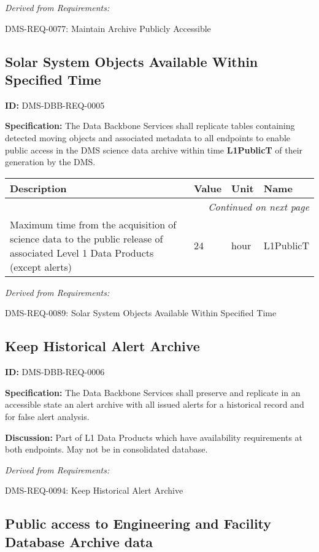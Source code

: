 \documentclass[SE,toc]{lsstdoc}
\makeatletter
\newcommand{\paramname}[1]{\hspace{0pt}#1}
\newcommand{\unitname}[1]{\hspace{0pt}#1}
\newenvironment{parameters}[0]{%
\setlength\LTleft{0pt}
\setlength\LTright{\fill}
\begin{small}
\begin{longtable}[]{|p{0.49\textwidth}|l|p{0.6in}|p{1.70in}@{}|}

\hline \textbf{Description} & \textbf{Value} & \textbf{Unit} & \textbf{Name} \\ \hline
\endhead

\hline \multicolumn{4}{r}{\emph{Continued on next page}} \\
\endfoot

\hline\hline
\endlastfoot
}{%
\hline
\end{longtable}
\end{small}
}
\makeatother
\begin{document}
\emph{Derived from Requirements:}

DMS-REQ-0077:
Maintain Archive Publicly Accessible \newline

\subsection{Solar System Objects Available Within Specified Time}

\label{DMS-DBB-REQ-0005}
\textbf{ID:} DMS-DBB-REQ-0005

\textbf{Specification:}
The Data Backbone Services shall replicate tables containing detected moving objects and associated metadata to all endpoints to enable public access in the DMS science data archive within time \textbf{L1PublicT} of their generation by the DMS.

\begin{parameters}
Maximum time from the acquisition of science data to the public release of associated Level 1 Data Products (except alerts)
&
24
&
\unitname{%
hour
}
&
\paramname{%
L1PublicT
} \\\hline
\end{parameters}

\emph{Derived from Requirements:}

DMS-REQ-0089:
Solar System Objects Available Within Specified Time \newline

\subsection{Keep Historical Alert Archive}

\label{DMS-DBB-REQ-0006}
\textbf{ID:} DMS-DBB-REQ-0006

\textbf{Specification:}
The Data Backbone Services shall preserve and replicate in an accessible state an alert archive with all issued alerts for a historical record and for false alert analysis.

\textbf{Discussion:}
Part of L1 Data Products which have availability requirements at both endpoints.  May not be in consolidated database.

\emph{Derived from Requirements:}

DMS-REQ-0094:
Keep Historical Alert Archive \newline

\subsection{Public access to Engineering and Facility Database Archive data}
\end{document}
